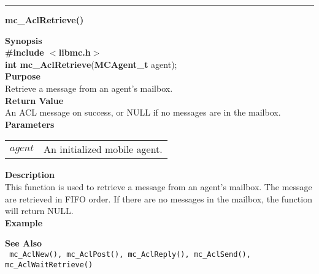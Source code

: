 \noindent
\vspace{5pt}
\rule{6.5in}{0.015in}
\noindent
{}
{\LARGE \bf mc\_AclRetrieve()}\\
\label{api:mc_AclRetrieve()}

\noindent
{\bf Synopsis}\\
{\bf \#include $<$libmc.h$>$}\\
{\bf int mc\_AclRetrieve}({\bf MCAgent\_t} agent);\\

\noindent
{\bf Purpose}\\
Retrieve a message from an agent's mailbox.\\

\noindent
{\bf Return Value}\\
An ACL message on success, or NULL if no messages are in the 
mailbox.\\

\noindent
{\bf Parameters}
\vspace{-0.1in}
\begin{description}
\item
\begin{tabular}{p{10 mm}p{145 mm}} 
$agent$ & An initialized mobile agent.
\end{tabular}
\end{description}

\noindent
{\bf Description}\\
This function is used to retrieve a message from an agent's mailbox. The
message are retrieved in FIFO order. If there are no messages in the
mailbox, the function will return NULL.\\

\noindent
{\bf Example}\\
\noindent
{\footnotesize }

\noindent
{\bf See Also}\\
\texttt{
  mc\_AclNew(), mc\_AclPost(), mc\_AclReply(), mc\_AclSend(), 
    \linebreak mc\_AclWaitRetrieve()
}

